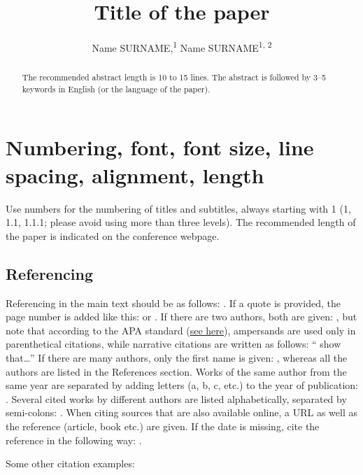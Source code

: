 \documentclass{article}
\title{Title of the paper}
\author{
  Name SURNAME,\textsuperscript{1} Name SURNAME\textsuperscript{1, 2}
}
\begin{document}
\maketitle

\begin{abstract}
The recommended abstract length is 10 to 15 lines. The abstract is followed by 3--5 keywords in English (or the language of the paper).
\end{abstract}


\section{Numbering, font, font size, line spacing, alignment, length}

Use numbers for the numbering of titles and subtitles, always starting with 1 (1, 1.1, 1.1.1; please avoid using more than three levels). The recommended length of the paper is indicated on the conference webpage.


\subsection{Referencing}

Referencing in the main text should be as follows: \cite{leech1992corpora}. If a quote is provided, the page number is added like this: \cite[p.~107]{leech1992corpora} or \cite[pp.~107--108]{leech1992corpora}. If there are two authors, both are given: \cite{studije2005korpusnem}, but note that according to the APA standard (\href{https://apastyle.apa.org/style-grammar-guidelines/citations/basic-principles/author-date}{see here}), ampersands are used only in parenthetical citations, while narrative citations are written as follows: `` show that\ldots'' If there are many authors, only the first name is given: \cite{biber1998corpus}, whereas all the authors are listed in the References section. Works of the same author from the same year are separated by adding letters (a, b, c, etc.) to the year of publication: \cite{erjavec-multext}. Several cited works by different authors are listed alphabetically, separated by semi-colons: \cite{erjavec-infotheca, tei}. When citing sources that are also available online, a URL as well as the reference (article, book etc.) are given. If the date is missing, cite the reference in the following way: \cite{creativecommons}.

Some other citation examples:
\end{document}
